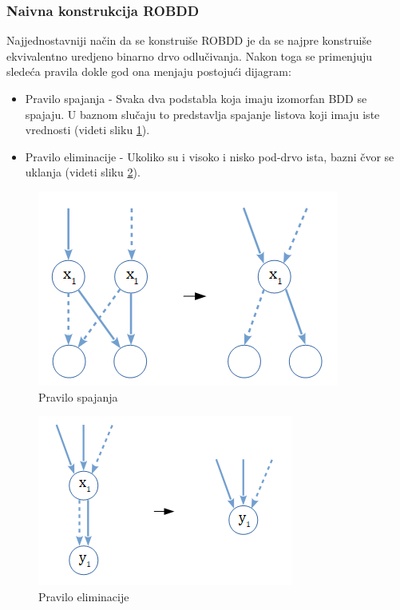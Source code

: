 \subsubsection{Naivna konstrukcija ROBDD}
\label{subsubsec:naiveROBDDConstruction}

Najjednostavniji na\v{c}in da se konstrui\v{s}e ROBDD je da se najpre konstrui\v{s}e ekvivalentno uredjeno binarno drvo odlu\v{c}ivanja. Nakon toga se primenjuju slede\'c{}a pravila dokle god ona menjaju postoju\'c{}i dijagram:
\begin{itemize}
    \item Pravilo spajanja - Svaka dva podstabla koja imaju izomorfan BDD se spajaju. U baznom slu\v{c}aju to predstavlja spajanje listova koji imaju iste vrednosti (videti sliku \ref{fig:reductionRule}).
    \item Pravilo eliminacije - Ukoliko su i visoko i nisko pod-drvo ista, bazni \v{c}vor se uklanja (videti sliku \ref{fig:eliminationRule}).
\end{itemize}

\begin{figure}[H]
    \centering
    \includegraphics[scale=0.7]{slike/pravilo_spajanja.PNG}
    \caption{Pravilo spajanja}
    \label{fig:reductionRule}
\end{figure}

\begin{figure}[H]
    \centering
    \includegraphics[scale=0.7]{slike/pravilo_eliminacije.PNG}
    \caption{Pravilo eliminacije}
    \label{fig:eliminationRule}
\end{figure}

